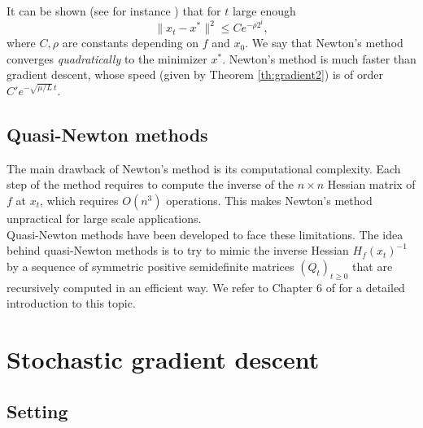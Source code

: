 \documentclass[11pt,nocut]{article}
\begin{document}
It can be shown (see for instance \cite{boyd2004convex}) that for $t$ large enough
\begin{equation}\label{eq:newton_conv}
\|x_t - x^* \|^2 \leq C e^{-\rho 2^t},
\end{equation}
where $C,\rho$ are constants depending on $f$ and $x_0$. We say that Newton's method converges \emph{quadratically} to the minimizer $x^*$. Newton's method is much faster than gradient descent, whose speed (given by Theorem \ref{th:gradient2}) is of order $C' e^{-\sqrt{\mu/L} \, t}$.

\subsection{Quasi-Newton methods}

The main drawback of Newton's method is its computational complexity. Each step of the method requires to compute the inverse of the $n \times n$ Hessian matrix of $f$ at $x_t$, which requires $O(n^3)$ operations. This makes Newton's method unpractical for large scale applications.
\\

Quasi-Newton methods have been developed to face these limitations. 
The idea behind quasi-Newton methods is to try to mimic the inverse Hessian $H_f(x_t)^{-1}$ by a sequence of symmetric positive semidefinite matrices $(Q_t)_{t \geq 0}$ that are recursively computed in an efficient way. We refer to Chapter 6 of \cite{nocedal2006numerical} for a detailed introduction to this topic.

\section{Stochastic gradient descent}

\subsection{Setting}
\end{document}
